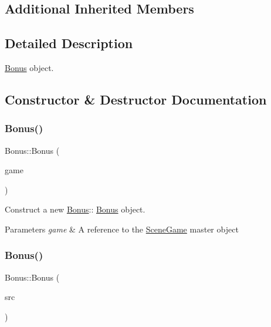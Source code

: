 \subsection*{Additional Inherited Members}


\subsection{Detailed Description}
\hyperlink{class_bonus}{Bonus} object. 

\subsection{Constructor \& Destructor Documentation}
\mbox{\label{class_bonus_a35c21e394ed7467d9bf1038cffc77047}} 
\subsubsection{\texorpdfstring{Bonus()}{Bonus()}\hspace{0.1cm}{\footnotesize\ttfamily [1/2]}}
{\footnotesize\ttfamily Bonus\+::\+Bonus (\begin{DoxyParamCaption}\item[{\hyperlink{class_scene_game}{Scene\+Game} \&}]{game }\end{DoxyParamCaption})\hspace{0.3cm}{\ttfamily [explicit]}}



Construct a new \hyperlink{class_bonus}{Bonus}\+:\+: \hyperlink{class_bonus}{Bonus} object. 


\begin{DoxyParams}{Parameters}
{\em game} & A reference to the \hyperlink{class_scene_game}{Scene\+Game} master object \\
\hline
\end{DoxyParams}
\mbox{\label{class_bonus_aedadb1a74a12d5c42f7dc26db1823ebd}} 
\subsubsection{\texorpdfstring{Bonus()}{Bonus()}\hspace{0.1cm}{\footnotesize\ttfamily [2/2]}}
{\footnotesize\ttfamily Bonus\+::\+Bonus (\begin{DoxyParamCaption}\item[{\hyperlink{class_bonus}{Bonus} const \&}]{src }\end{DoxyParamCaption})}



